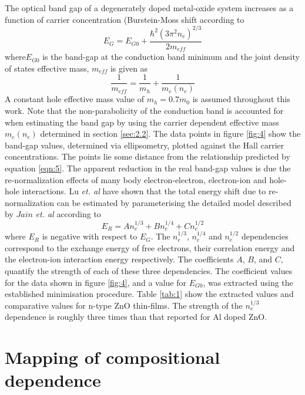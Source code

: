\documentclass[preprint]{elsarticle}
\begin{document}
The optical band gap of a degenerately doped metal-oxide system increases as a function of carrier concentration (Burstein-Moss shift \cite{Burstein1954,Moss1954} according to
\begin{equation}
\label{eqn:5}
E_G = E_{G0} + \frac{\hbar^2(3\pi^2n_e)^{2/3}}{2m_{eff}}
\end{equation}
where$E_{G0}$ is the band-gap at the conduction band minimum and the joint density of states effective mass, $m_{eff}$ is given as
\begin{equation}
\label{eqn:6}
\frac{1}{m_{eff}} = \frac{1}{m_h}+\frac{1}{m_e(n_e)}
\end{equation}
A constant hole effective mass value of $m_h = 0.7m_0$ \cite{} is assumed throughout this work. Note that the non-parabolicity of the conduction band is accounted for when estimating the band gap by using the carrier dependent effective mass $m_e(n_e)$ determined in section \ref{sec:2.2}. The data points in figure \ref{fig:4} show the band-gap values, determined via ellipsometry, plotted against the Hall carrier concentrations. The points lie some distance from the relationship predicted by equation \ref{eqn:5}. The apparent reduction in the real band-gap values is due the re-normalization effects of many body electron-electron, electron-ion and hole-hole interactions. Lu \textit{et. al} \cite{Lu2007} have shown that the total energy shift due to re-normalization can be estimated by parameterising the detailed model described by $Jain$ \textit{et. al} \cite{Jain1990, Jain1991} according to 
\begin{equation}
\label{eqn:7}
E_R = An_e^{1/3} + Bn_e^{1/4} + Cn_e^{1/2}
\end{equation}
where $E_R$ is negative with respect to $E_G$. The $n_e^{1/3}$, $n_e^{1/4}$ and $n_e^{1/2}$ dependencies correspond to the exchange energy of free electrons, their correlation energy and the electron-ion interaction energy respectively. The coefficients $A$, $B$, and $C$, quantify the strength of each of these three dependencies. The coefficient values for the data shown in figure \ref{fig:4}, and a value for $E_{G0}$, was extracted using the established minimisation procedure. Table \ref{tab:1} show the extracted values and comparative values for n-type ZnO thin-films. The strength of the $n_e^{1/3}$ dependence is roughly three times than that reported for Al doped ZnO.

\section{Mapping of compositional dependence}
\label{sec:2.3}
\end{document}
